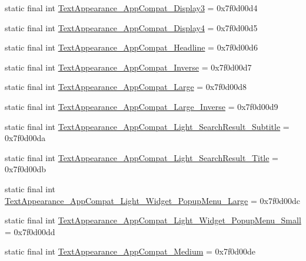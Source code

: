 \begin{DoxyCompactItemize}
\item 
static final int \mbox{\hyperlink{classandroid_1_1support_1_1design_1_1R_1_1style_afcc42ebd522f07fcc0fd82c0b6c8ec54}{Text\+Appearance\+\_\+\+App\+Compat\+\_\+\+Display3}} = 0x7f0d00d4
\item 
static final int \mbox{\hyperlink{classandroid_1_1support_1_1design_1_1R_1_1style_a9b9f3be8cc0db80bccd10e2d09001c13}{Text\+Appearance\+\_\+\+App\+Compat\+\_\+\+Display4}} = 0x7f0d00d5
\item 
static final int \mbox{\hyperlink{classandroid_1_1support_1_1design_1_1R_1_1style_a8d4490bb630d7ae6f24ef8a91885d63e}{Text\+Appearance\+\_\+\+App\+Compat\+\_\+\+Headline}} = 0x7f0d00d6
\item 
static final int \mbox{\hyperlink{classandroid_1_1support_1_1design_1_1R_1_1style_acc2c875b4af6beac9360f42572c25d9a}{Text\+Appearance\+\_\+\+App\+Compat\+\_\+\+Inverse}} = 0x7f0d00d7
\item 
static final int \mbox{\hyperlink{classandroid_1_1support_1_1design_1_1R_1_1style_ad3d980817c920614b02aac4354be82e7}{Text\+Appearance\+\_\+\+App\+Compat\+\_\+\+Large}} = 0x7f0d00d8
\item 
static final int \mbox{\hyperlink{classandroid_1_1support_1_1design_1_1R_1_1style_a12013c3ce690759654e8b1a05327e0c9}{Text\+Appearance\+\_\+\+App\+Compat\+\_\+\+Large\+\_\+\+Inverse}} = 0x7f0d00d9
\item 
static final int \mbox{\hyperlink{classandroid_1_1support_1_1design_1_1R_1_1style_ab6a60e6b39b2f6c94adbf6523ca0ddf7}{Text\+Appearance\+\_\+\+App\+Compat\+\_\+\+Light\+\_\+\+Search\+Result\+\_\+\+Subtitle}} = 0x7f0d00da
\item 
static final int \mbox{\hyperlink{classandroid_1_1support_1_1design_1_1R_1_1style_ad43f8905df9054ea1c5ee01caaa9aae2}{Text\+Appearance\+\_\+\+App\+Compat\+\_\+\+Light\+\_\+\+Search\+Result\+\_\+\+Title}} = 0x7f0d00db
\item 
static final int \mbox{\hyperlink{classandroid_1_1support_1_1design_1_1R_1_1style_a0ab8d102e79fb4df376280670f497119}{Text\+Appearance\+\_\+\+App\+Compat\+\_\+\+Light\+\_\+\+Widget\+\_\+\+Popup\+Menu\+\_\+\+Large}} = 0x7f0d00dc
\item 
static final int \mbox{\hyperlink{classandroid_1_1support_1_1design_1_1R_1_1style_a51f65809127f437f963c959df41f55ca}{Text\+Appearance\+\_\+\+App\+Compat\+\_\+\+Light\+\_\+\+Widget\+\_\+\+Popup\+Menu\+\_\+\+Small}} = 0x7f0d00dd
\item 
static final int \mbox{\hyperlink{classandroid_1_1support_1_1design_1_1R_1_1style_a6f36f3944c8c9e72bb28b1b6f6f55a08}{Text\+Appearance\+\_\+\+App\+Compat\+\_\+\+Medium}} = 0x7f0d00de

\end{DoxyCompactItemize}
